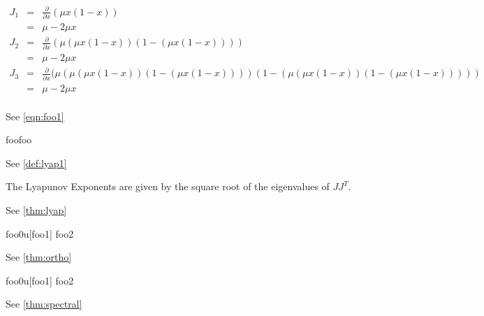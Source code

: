 \documentclass{elsart1p}
\begin{document}
\begin{eqnarray*}
J_{1} &=& \frac{ \partial }{\partial x} (\mu x (1 - x)) \\
      &=& \mu - 2\mu x \\
J_{2} &=& \frac{ \partial }{\partial x} (\mu (\mu x (1-x)) (1 - (\mu x (1-x)))) \\
      &=& \mu - 2\mu x \\
J_{3} &=& \frac{ \partial }{\partial x} (\mu (\mu (\mu x (1-x)) (1-(\mu x (1-x)))) (1 - (\mu (\mu x (1-x)) (1-(\mu x (1-x))))) \\
      &=& \mu - 2\mu x \\
\end{eqnarray*}



See \ref{eqn:foo1}

\begin{def}

foofoo

\label{def:lyap1}
\end{def}

See \ref{def:lyap1}

\begin{thm}
The Lyapunov Exponents are given by the square root of the eigenvalues of $JJ^{T}$.
\label{thm:lyap}
\end{thm}

See \ref{thm:lyap}

\begin{thm}
{foo0u}[foo1]
foo2
\label{thm:ortho}
\end{thm}

See \ref{thm:ortho}

\begin{thm}
{foo0u}[foo1]
foo2
\label{thm:spectral}
\end{thm}

See \ref{thm:spectral}
\end{document}
